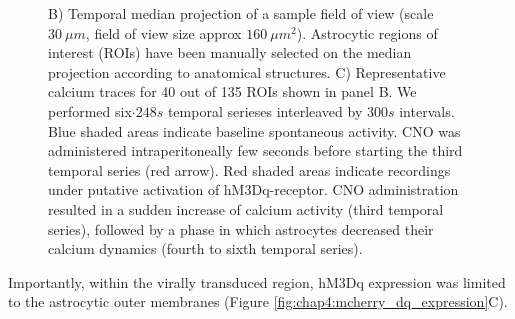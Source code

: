 \begin{figure}[h!]
{    B) Temporal median projection of a sample field of view (scale $30\ \mu m$, field of view size approx $160\ \mu m^2$). 
    Astrocytic regions of interest (ROIs) have been manually selected on the median projection according to anatomical structures. 
    C) Representative calcium traces for 40 out of 135 ROIs shown in panel B. We performed six$\cdot 248 s$ temporal serieses interleaved by $300 s$ intervals. 
    Blue shaded areas indicate baseline spontaneous activity. 
    CNO was administered intraperitoneally few seconds before starting the third temporal series (red arrow).  
    Red shaded areas indicate recordings under putative activation of hM3Dq-receptor. 
    CNO administration resulted in a sudden increase of calcium activity (third temporal series), followed by a phase in which astrocytes decreased their calcium dynamics (fourth to sixth temporal series).}
    \label{fig:chap4:CNO_effect_calcium}
\end{figure}
Importantly, within the virally transduced region, hM3Dq expression was limited to the astrocytic outer membranes (Figure \ref{fig:chap4:mcherry_dq_expression}C).
